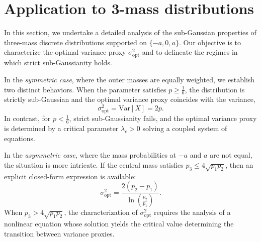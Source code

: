 \documentclass[a4paper, 10pt]{article}
\theoremstyle{definition}
\begin{document}





\section{Application to 3-mass distributions}\label{sec:3-mass}



In this section, we undertake a detailed analysis of the sub-Gaussian properties of three-mass discrete distributions supported on $\{-a,0,a\}$. Our objective is to characterize the optimal variance proxy $\sigma^2_{\mathrm{opt}}$ and to delineate the regimes in which strict sub-Gaussianity holds.  

In the \textit{symmetric case}, where the outer masses are equally weighted, we establish two distinct behaviors. When the parameter satisfies $p \geq \tfrac{1}{6}$, the distribution is strictly sub-Gaussian and the optimal variance proxy coincides with the variance,
\[
\sigma^2_{\mathrm{opt}} = \mathrm{Var}[X] = 2p.
\]
In contrast, for $p < \tfrac{1}{6}$, strict sub-Gaussianity fails, and the optimal variance proxy is determined by a critical parameter $\lambda_c > 0$ solving a coupled system of equations.  

In the \textit{asymmetric case}, where the mass probabilities at $-a$ and $a$ are not equal, the situation is more intricate. If the central mass satisfies $p_3 \leq 4\sqrt{p_1p_2}$, then an explicit closed-form expression is available:
\[
\sigma^2_{\mathrm{opt}} = \frac{2(p_2 - p_1)}{\ln\!\left(\tfrac{p_2}{p_1}\right)}.
\]
When $p_3 > 4\sqrt{p_1p_2}$, the characterization of $\sigma^2_{\mathrm{opt}}$ requires the analysis of a nonlinear equation whose solution yields the critical value determining the transition between variance proxies.  
 
\end{document}
